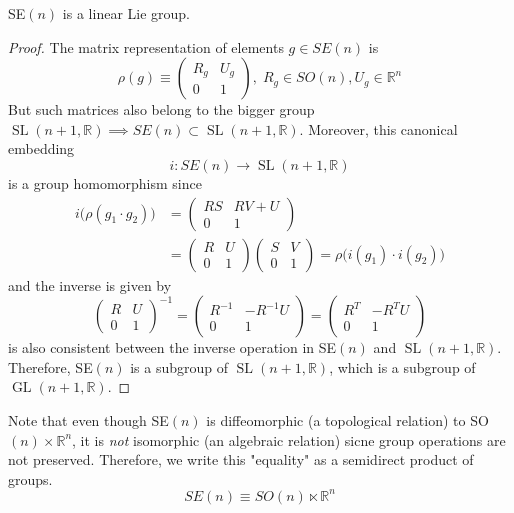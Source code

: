 \documentclass{article}
\DeclareMathOperator{\GL}{GL}
\DeclareMathOperator{\SL}{SL}
\begin{document}
    \begin{proposition}
    SE$(n)$ is a linear Lie group. 
    \end{proposition}
    \begin{proof}
    The matrix representation of elements $g \in SE(n)$ is 
    \[\rho(g) \equiv \begin{pmatrix}
    R_g & U_g \\ 0 & 1
    \end{pmatrix}, \; R_g \in SO(n), U_g \in \mathbb{R}^n\]
    But such matrices also belong to the bigger group $\SL(n+1, \mathbb{R}) \implies SE(n) \subset \SL(n+1, \mathbb{R})$. Moreover, this canonical embedding 
    \[i: SE(n) \longrightarrow \SL(n+1, \mathbb{R})\]
    is a group homomorphism since
    \begin{align*}
        i\big( \rho(g_1 \cdot g_2) \big) & = \begin{pmatrix}
        RS & RV + U \\ 0 & 1
        \end{pmatrix} \\
        & = \begin{pmatrix}
        R & U \\ 0 & 1
        \end{pmatrix} \begin{pmatrix}
        S & V \\ 0 & 1
        \end{pmatrix} = \rho \big( i(g_1) \cdot i(g_2) \big) 
    \end{align*}
    and the inverse is given by 
    \[\begin{pmatrix}
    R & U \\ 0 & 1
    \end{pmatrix}^{-1} = \begin{pmatrix}
    R^{-1} & - R^{-1} U \\ 0 & 1
    \end{pmatrix} = \begin{pmatrix}
    R^T & - R^T U \\ 0 & 1
    \end{pmatrix}\]
    is also consistent between the inverse operation in SE$(n)$ and $\SL(n+1, \mathbb{R})$. Therefore, SE$(n)$ is a subgroup of $\SL(n+1, \mathbb{R})$, which is a subgroup of $\GL(n+1, \mathbb{R})$. 
    \end{proof}

    Note that even though SE$(n)$ is diffeomorphic (a topological relation) to SO$(n) \times \mathbb{R}^n$, it is \textit{not} isomorphic (an algebraic relation) sicne group operations are not preserved. Therefore, we write this "equality" as a semidirect product of groups. 
    \[SE(n) \equiv SO(n) \ltimes \mathbb{R}^n\]
\end{document}
